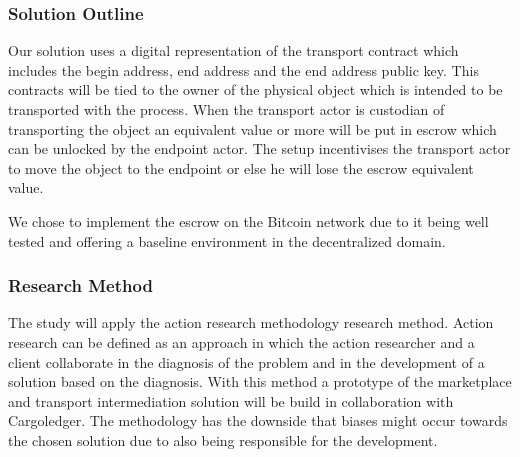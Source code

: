 
\subsubsection{Solution Outline}

Our solution uses a digital representation of the transport contract which includes the begin address, end address and the end address public key. This contracts will be tied to the owner of the physical object which is intended to be transported with the process. When the transport actor is custodian of transporting the object an equivalent value or more will be put in escrow which can be unlocked by the endpoint actor. The setup incentivises the transport actor to move the object to the endpoint or else he will lose the escrow equivalent value. \par
We chose to implement the escrow on the Bitcoin network due to it being well tested and offering a baseline environment in the decentralized domain.

%

\subsubsection{Research Method}

The study will apply the action research methodology research method. Action research can be defined as an approach in which the action researcher and a client collaborate in the diagnosis of the problem and in the development of a solution based on the diagnosis. With this method a prototype of the marketplace and transport intermediation solution will be build in collaboration with Cargoledger. The methodology has the downside that biases might occur towards the chosen solution due to also being responsible for the development.\par

